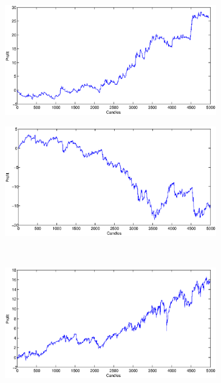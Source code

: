 \documentclass{tewiart}
\begin{document}
\begin{figure}[h]
\centering
\begin{minipage}{.49\linewidth}
\centering 
\includegraphics[width=0.82\textwidth]{images/S1a_eurjpy.eps}
\label{jedno}
\end{minipage}
\begin{minipage}{.49\linewidth}
\centering 
\includegraphics[width=0.82\textwidth]{images/S1b_eurjpy.eps}
\label{dwu}
\end{minipage}
\\
\begin{minipage}{.49\linewidth}
\centering 
\includegraphics[width=0.82\textwidth]{images/S1c_eurjpy.eps}
\label{cztero}
\end{minipage}
\begin{minipage}{.49\linewidth}

\end{minipage}
\end{figure}
\end{document}
